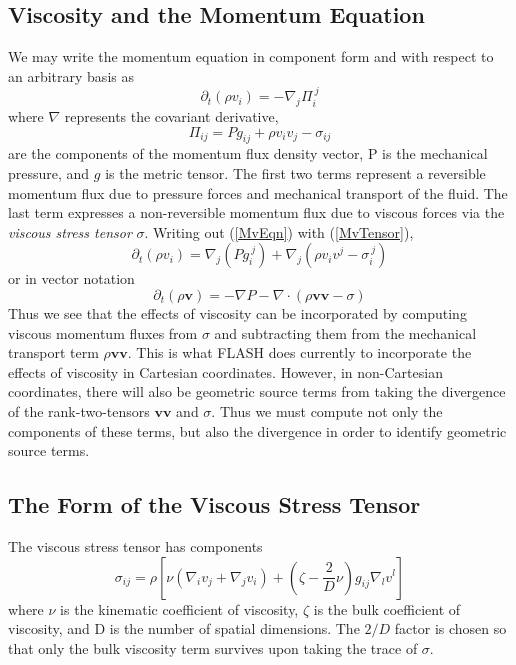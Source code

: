 \subsection{Viscosity and the Momentum Equation}
We may write the momentum equation in component form and with respect to an arbitrary basis as
\begin{equation}
\partial_t(\rho v_i) = -\nabla_j \Pi_{ i}^{\ j}
\label{MvEqn} 
\end{equation}
where $\nabla$ represents the covariant derivative,
\begin{equation}
\Pi_{ij}  = P g_{ij} + \rho v_i v_j - \sigma_{ij}
\label{MvTensor}
\end{equation}
are the components of the momentum flux density vector, P is the mechanical pressure, and $g$ is the metric tensor. The first two terms represent a reversible momentum flux due to pressure forces and mechanical transport of the fluid. The last term expresses a non-reversible momentum flux due to viscous forces via the \textit{viscous stress tensor} $\sigma$. Writing out (\ref{MvEqn}) with (\ref{MvTensor}),
\begin{equation}
\partial_t(\rho v_i) = \nabla_j (P g_{ i}^{\ j} ) +  \nabla_j (\rho v_i v^j - \sigma_{ i}^{\ j} ) \nonumber
\end{equation} 
or in vector notation
\begin{equation}
\partial_t(\rho \mathbf{v}) = -\nabla P -  \nabla \cdot (\rho \mathbf{v v} - \sigma) 
\label{MvVector}
\end{equation} 
Thus we see that the effects of viscosity can be incorporated by computing viscous momentum fluxes from $\sigma$ and subtracting them from the mechanical transport term $\rho \mathbf{v v}$. This is what FLASH does currently to incorporate the effects of viscosity in Cartesian coordinates. However, in non-Cartesian coordinates, there will also be geometric source terms from taking the divergence of the rank-two-tensors $\mathbf{v v}$ and $\sigma$. Thus we must compute not only the components of these terms, but also the divergence in order to identify geometric source terms.

\subsection{The Form of the Viscous Stress Tensor}
The viscous stress tensor has components \citep{LandauLifschitz:Fluids}
\begin{equation}
\sigma_{ij} = \rho \left[ \nu\left(\nabla_i v_j + \nabla_j v_i \right) + \left(\zeta - \frac{2}{D} \nu \right) g_{ij} \nabla_l  v^l   \right]
\label{ViscTensor}
\end{equation}
where $\nu$ is the kinematic coefficient of viscosity, $\zeta$ is the bulk coefficient of viscosity, and D is the number of spatial dimensions. The $2/D$ factor is chosen so that only the bulk viscosity term survives upon taking the trace of $\sigma$. 



